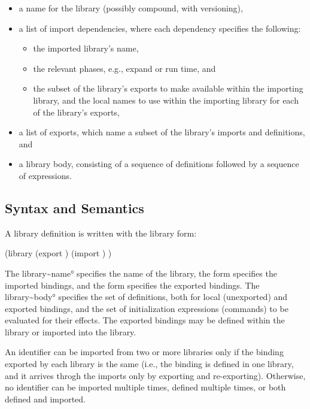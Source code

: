 \documentclass{monograph}
\begin{document}
\begin{itemize}
\item a name for the library (possibly compound, with versioning),
\item a list of import dependencies, where each dependency specifies the
      following:
\begin{itemize}
\item the imported library's name,
\item the relevant phases, e.g., expand or run time, and
\item the subset of the library's exports to make available within the
      importing library, and the local names to use within the importing
      library for each of the library's exports,
\end{itemize}
\item a list of exports, which name a subset of the library's imports and
      definitions, and
\item a library body, consisting of a sequence of definitions followed
      by a sequence of expressions.
\end{itemize}

\subsection{Syntax and Semantics}

A library definition is written with the library form:

\schemedisplay
(library 
  (export \raw{\kstar})
  (import \raw{\kstar})
  )
\endschemedisplay

The \ang{library~name} specifies the name of the library, the
 form specifies the imported bindings, and the
 form specifies the exported bindings.
The \ang{library~body} specifies the set of definitions, both for local
(unexported) and exported bindings, and the set of initialization
expressions (commands) to be evaluated for their effects.
The exported bindings may be defined within the library or imported into
the library.

An identifier can be imported from two or more libraries only if the
binding exported by each library is the same (i.e., the binding is
defined in one library, and it arrives throgh the imports only by
exporting and re-exporting).  Otherwise, no identifier can be imported
multiple times, defined multiple times, or both defined and imported.
\end{document}
